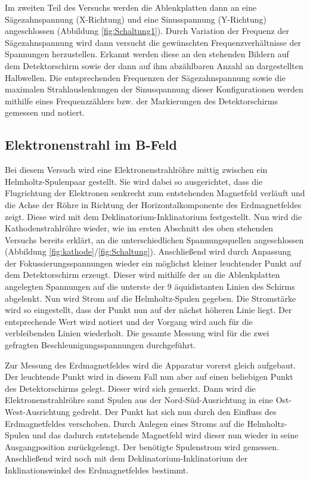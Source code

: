 Im zweiten Teil des Versuchs werden die Ablenkplatten dann an eine Sägezahnspannung (X-Richtung)
und eine Sinusspannung (Y-Richtung) angeschlossen (Abbildung \ref{fig:Schaltung1}). Durch Variation
der Frequenz der Sägezahnspannung wird dann versucht die gewünschten Frequenzverhältnisse
der Spannungen herzustellen. Erkannt werden diese an den stehenden Bildern auf dem
Detektorschirm sowie der dann auf ihm abzählbaren Anzahl an dargestellten Halbwellen.
Die entsprechenden Frequenzen der Sägezahnspannung sowie die maximalen Strahlauslenkungen der Sinusspannung
dieser Konfigurationen werden mithilfe eines Frequenzzählers bzw. der Markierungen des Detektorschirms
gemessen und notiert.


\subsection{Elektronenstrahl im B-Feld}
Bei diesem Versuch wird eine Elektronenstrahlröhre mittig zwischen ein Helmholtz-Spulenpaar gestellt.
Sie wird dabei so ausgerichtet, dass die Flugrichtung der Elektronen senkrecht zum entstehenden Magnetfeld
verläuft und die Achse der Röhre in Richtung der Horizontalkomponente des Erdmagnetfeldes zeigt. Diese
wird mit dem Deklinatorium-Inklinatorium festgestellt. Nun wird die Kathodenstrahlröhre wieder, wie im ersten
Abschnitt des oben stehenden Versuchs bereits erklärt, an die unterschiedlichen Spannungsquellen angeschlossen (Abbildung \ref{fig:kathode}/\ref{fig:Schaltung}).
Anschließend wird durch Anpassung der Fokussierungsspannungen wieder ein möglichst kleiner leuchtender Punkt auf
dem Detektorschirm erzeugt. Dieser wird mithilfe der an die Ablenkplatten angelegten Spannungen auf die unterste
der 9 äquidistanten Linien des Schirms abgelenkt. Nun wird Strom auf die Helmholtz-Spulen gegeben. Die Stromstärke
wird so eingestellt, dass der Punkt nun auf der nächst höheren Linie liegt. Der entsprechende Wert wird notiert und
der Vorgang wird auch für die verbleibenden Linien wiederholt. Die gesamte Messung wird für die zwei gefragten
Beschleunigungsspannungen durchgeführt.

Zur Messung des Erdmagnetfeldes wird die Apparatur vorerst gleich aufgebaut. Der leuchtende Punkt wird in diesem Fall
nun aber auf einen beliebigen Punkt des Detektorschirms gelegt. Dieser wird sich gemerkt. Dann wird die
Elektronenstrahlröhre samt Spulen aus der Nord-Süd-Ausrichtung in eine Ost-West-Ausrichtung gedreht. Der Punkt hat sich
nun durch den Einfluss des Erdmagnetfeldes verschoben. Durch Anlegen eines Stroms auf die Helmholtz-Spulen und das dadurch
entstehende Magnetfeld wird dieser nun wieder in seine Ausgangposition zurückgelengt. Der benötigte Spulenstrom wird gemessen.
Anschließend wird noch mit dem Deklinatorium-Inklinatorium der Inklinationswinkel des Erdmagnetfeldes bestimmt.

